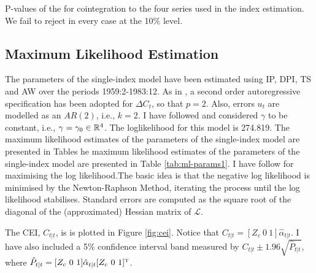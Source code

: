 	\begin{table}[h!]
		\centering\small
		\captionsetup{width=0.6\textwidth, font=small}
		\caption{P-values of the \protect\cite{engle1987co} for cointegration to the four series used in the index estimation. We fail to reject in every case at the 10\% level.}
		
	\end{table}

\subsection{Maximum Likelihood Estimation}

The parameters of the single-index model have been estimated using IP, DPI, TS and AW over the periods 1959:2-1983:12. As in , a second order autoregressive  specification  has been adopted for $\Delta C_t$, so that $p=2$. Also, errors $u_t$ are modelled as an $AR(2)$, i.e., $k=2$. I have followed  and considered $\gamma$ to be constant, i.e., $\gamma = \gamma_0\in\mathbb{R}^4$. The loglikelihood for this model is 274.819. The maximum likelihood estimates of the parameters of the single-index model are presented in Tables  he maximum likelihood estimates of the parameters of the single-index model are presented in Table \ref{tab:ml-params1}. I have follow  for maximising the log likelihood.The basic idea is that the negative log likelihood is minimised by the Newton-Raphson Method, iterating the process until the log likelihood stabilises. Standard errors are computed as the square root of the diagonal of the (approximated) Hessian matrix of $\mathcal{L}$.


The CEI, $C_{t|t}$,  is is plotted in Figure \ref{fig:cei}. Notice that  $C_{t|t} = [Z_c \ 0 \ 1] \hat{\alpha}_{t|t}$. I have also included a 5\% confidence interval band measured by $C_{t|t}\pm 1.96 \sqrt{\hat{P}_{t|t}}$, where $\hat{P}_{t|t} = [Z_c \ 0 \ 1] \hat{\alpha}_{t|t}[Z_c \ 0 \ 1]^{\text{\tiny T}}$. 



